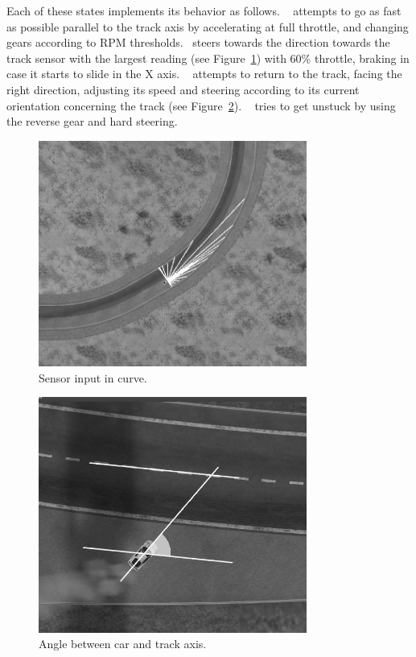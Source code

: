 Each of these states implements its behavior as follows. \SL~ attempts to go as fast as possible parallel to the track axis by accelerating at full throttle, and changing gears according to RPM thresholds. \C~steers towards the direction towards the track sensor with the largest reading (see Figure~\ref{Fig:FSensor}) with 60\% throttle, braking in case it starts to slide in the X axis. \OT~ attempts to return to the track, facing the right direction, adjusting its speed and steering according to its current orientation concerning the track (see Figure~\ref{Fig:Angle}). \St~ tries to get unstuck by using the reverse gear and hard steering.

\begin{figure}[h]
	\centering
	\includegraphics[width=250pt]{FarthestSensor}
	\caption{Sensor input in curve.}
	\label{Fig:FSensor}
\end{figure}

\begin{figure}%
		\centering
		\includegraphics[width=250pt]{ReturnAngle}
		\caption{Angle between car and track axis.}
		\label{Fig:Angle}
\end{figure}

